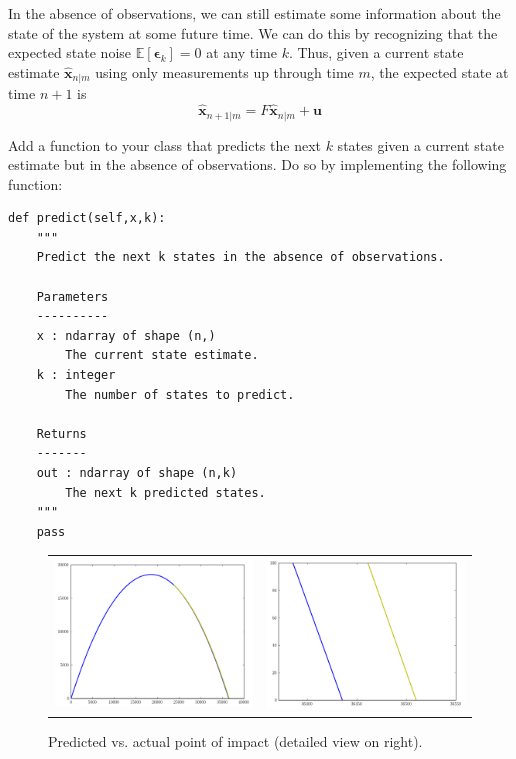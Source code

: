 In the absence of observations, we can still estimate some information about the state of the system at some future time.
We can do this by recognizing that the expected state noise $\mathbb{E}\left[\boldsymbol{\epsilon}_{k}\right] = 0$ at any time $k$.
Thus, given a current state estimate $\widehat{\mathbf{x}}_{n|m}$ using only measurements up through time $m$, the expected state at time $n+1$ is
\begin{equation*}
\widehat{\mathbf{x}}_{n+1|m} = F \widehat{\mathbf{x}}_{n|m} + \mathbf{u}
\end{equation*}

\begin{problem}
Add a function to your class that predicts the next $k$ states given a current state estimate but in the absence of observations.
Do so by implementing the following function:
\begin{lstlisting}
def predict(self,x,k):
    """
    Predict the next k states in the absence of observations.

    Parameters
    ----------
    x : ndarray of shape (n,)
        The current state estimate.
    k : integer
        The number of states to predict.

    Returns
    -------
    out : ndarray of shape (n,k)
        The next k predicted states.
    """
    pass
\end{lstlisting}
\end{problem}

\begin{figure}
    \centering
    \begin{tabular}{cc}
    \includegraphics[width=.45\textwidth]{impact_macro} &
    \includegraphics[width=.45\textwidth]{impact_micro}
    \end{tabular}
    \caption{Predicted vs. actual point of impact (detailed view on right).}
    \label{fig:impact}
\end{figure}

